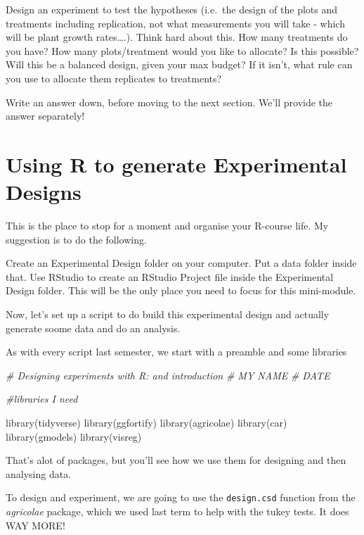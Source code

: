 \documentclass[
]{book}
\newenvironment{Shaded}{\begin{snugshade}}{\end{snugshade}}
\newcommand{\CommentTok}[1]{\textcolor[rgb]{0.56,0.35,0.01}{\textit{#1}}}
\newcommand{\FunctionTok}[1]{\textcolor[rgb]{0.00,0.00,0.00}{#1}}
\newcommand{\NormalTok}[1]{#1}
\begin{document}
Design an experiment to test the hypotheses (i.e.~the design of the plots and treatments including replication, not what measurements you will take - which will be plant growth rates\ldots.). Think hard about this. How many treatments do you have? How many plots/treatment would you like to allocate? Is this possible? Will this be a balanced design, given your max budget? If it isn't, what rule can you use to allocate them replicates to treatments?

Write an answer down, before moving to the next section. We'll provide the answer separately!

\hypertarget{using-r-to-generate-experimental-designs}{%
\section{Using R to generate Experimental Designs}\label{using-r-to-generate-experimental-designs}}

This is the place to stop for a moment and organise your R-course life. My suggestion is to do the following.

Create an Experimental Design folder on your computer. Put a data folder inside that. Use RStudio to create an RStudio Project file inside the Experimental Design folder. This will be the only place you need to focus for this mini-module.

Now, let's set up a script to do build this experimental design and actually generate soome data and do an analysis.

As with every script last semester, we start with a preamble and some libraries

\begin{Shaded}
\begin{Highlighting}[]
\CommentTok{\# Designing experiments with R: and introduction}
\CommentTok{\# MY NAME}
\CommentTok{\# DATE}

\CommentTok{\#libraries I need}

\FunctionTok{library}\NormalTok{(tidyverse)}
\FunctionTok{library}\NormalTok{(ggfortify)}
\FunctionTok{library}\NormalTok{(agricolae)}
\FunctionTok{library}\NormalTok{(car)}
\FunctionTok{library}\NormalTok{(gmodels)}
\FunctionTok{library}\NormalTok{(visreg)}
\end{Highlighting}
\end{Shaded}

That's alot of packages, but you'll see how we use them for designing and then analysing data.

To design and experiment, we are going to use the \texttt{design.csd} function from the \emph{agricolae} package, which we used last term to help with the tukey tests. It does WAY MORE!
\end{document}
